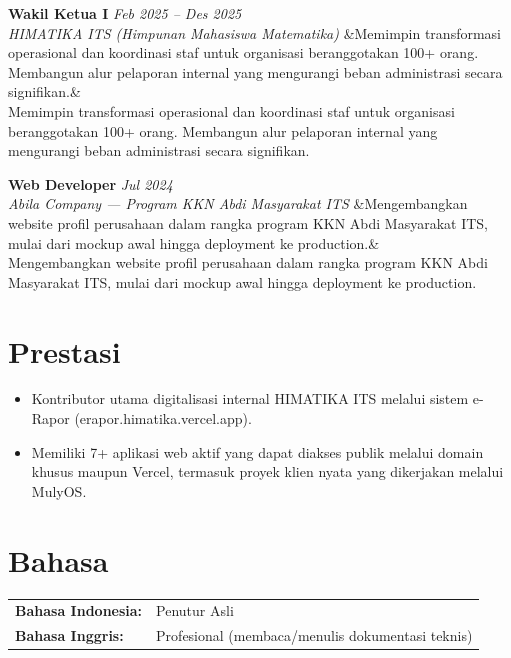 \documentclass[a4paper,11pt]{article}
\newcommand{\cventry}[4]{%
  \noindent\textbf{#1} \hfill \textit{#3} \\
  \textit{#2}
  \ifx&#4& \else \\ \small #4 \fi
  \vspace{6pt}
}
\begin{document}
\cventry
  {Wakil Ketua I}
  {HIMATIKA ITS (Himpunan Mahasiswa Matematika)}
  {Feb 2025 -- Des 2025}
  {Memimpin transformasi operasional dan koordinasi staf untuk organisasi beranggotakan 100+ orang. Membangun alur pelaporan internal yang mengurangi beban administrasi secara signifikan.}

\cventry
  {Web Developer}
  {Abila Company --- Program KKN Abdi Masyarakat ITS}
  {Jul 2024}
  {Mengembangkan website profil perusahaan dalam rangka program KKN Abdi Masyarakat ITS, mulai dari mockup awal hingga deployment ke production.}

\section{Prestasi}
\begin{itemize}[leftmargin=15pt, nosep]
  \item Kontributor utama digitalisasi internal HIMATIKA ITS melalui sistem e-Rapor (erapor.himatika.vercel.app).
  \item Memiliki 7+ aplikasi web aktif yang dapat diakses publik melalui domain khusus maupun Vercel, termasuk proyek klien nyata yang dikerjakan melalui MulyOS.
\end{itemize}

\section{Bahasa}
\begin{tabularx}{\textwidth}{@{}l l@{}}
\textbf{Bahasa Indonesia:} & Penutur Asli \\
\textbf{Bahasa Inggris:} & Profesional (membaca/menulis dokumentasi teknis) \\
\end{tabularx}
\end{document}
